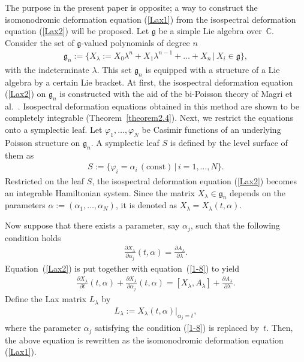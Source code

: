 \documentclass[10pt,a4paper]{amsart}
\numberwithin{equation}{section}
\begin{document}
The purpose in the present paper is opposite; a way to construct the isomonodromic deformation equation (\ref{Lax1}) from the isospectral deformation equation (\ref{Lax2}) will be proposed. Let $\mathfrak{g}$ be a simple Lie algebra over~$\mathbb{C}$. Consider the set of $\mathfrak{g}$-valued polynomials of degree $n$
\begin{gather*}
\mathfrak{g}_n:= \big\{ X_\lambda := X_0 \lambda ^n + X_1\lambda ^{n-1} + \dots + X_n \, | \, X_i\in \mathfrak{g}\big\},
\end{gather*}
with the indeterminate $\lambda $. This set $\mathfrak{g}_n$ is equipped with a structure of a Lie algebra by a certain Lie bracket. At f\/irst, the isospectral deformation equation (\ref{Lax2}) on $\mathfrak{g}_n$ is constructed with the aid of the bi-Poisson theory of Magri et al.~\cite{Mag1, Mag2, Mag3, Mag4}. Isospectral deformation equations obtained in this method are shown to be completely integrable (Theorem~\ref{theorem2.4}). Next, we restrict the equations onto a symplectic leaf. Let $\varphi _1 , \dots ,\varphi _N$ be Casimir functions of an underlying Poisson structure on $\mathfrak{g}_n$.
A symplectic leaf $S$ is def\/ined by the level surface of them as
\begin{gather*}
S:=\{ \varphi _i= \alpha _i \, (\text{const}) \, | \, i=1, \dots ,N\}.
\end{gather*}
Restricted on the leaf $S$, the isospectral deformation equation (\ref{Lax2}) becomes an integrable Hamiltonian system. Since the matrix $X_\lambda \in \mathfrak{g}_n$ depends on the parameters $\alpha := (\alpha_1, \dots ,\alpha _N)$, it is denoted as $X_\lambda = X_\lambda (t, \alpha )$.

Now suppose that there exists a parameter, say $\alpha _{j}$, such that the following condition holds
\begin{gather}
\frac{\partial X_\lambda }{\partial \alpha _{j}}(t, \alpha ) = \frac{\partial A_\lambda }{\partial \lambda }.\label{1-8}
\end{gather}
Equation~(\ref{Lax2}) is put together with equation~(\ref{1-8}) to yield
\begin{gather*}
\frac{\partial X_\lambda}{\partial t}(t,\alpha ) + \frac{\partial X_\lambda }{\partial \alpha _{j}}(t, \alpha )
 = [X_\lambda , A_\lambda ]+\frac{\partial A_\lambda }{\partial \lambda }.
\end{gather*}
Def\/ine the Lax matrix $L_\lambda $ by
\begin{gather*}
L_\lambda := X_\lambda (t, \alpha )|_{\alpha _{j} = t},
\end{gather*}
where the parameter $\alpha _{j}$ satisfying the condition (\ref{1-8}) is replaced by~$t$. Then, the above equation is rewritten as the isomonodromic deformation equation (\ref{Lax1}).
\end{document}
